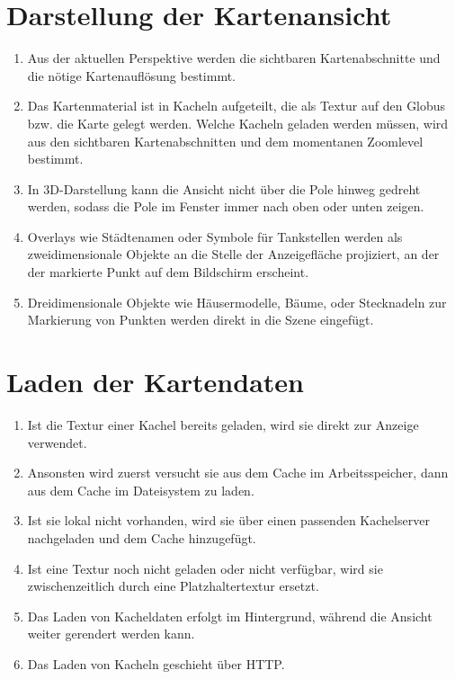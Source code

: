 \documentclass[10pt]{scrreprt}
\begin{document}
\section{Darstellung der Kartenansicht}
\begin{enumerate}[leftmargin=2cm]
\item Aus der aktuellen Perspektive werden die sichtbaren Kartenabschnitte und die nötige Kartenauflösung bestimmt.
\item Das Kartenmaterial ist in Kacheln aufgeteilt, die als Textur auf den Globus bzw. die Karte gelegt werden. Welche Kacheln geladen werden müssen, wird  aus den sichtbaren Kartenabschnitten und dem momentanen Zoomlevel bestimmt.
\item In 3D-Darstellung kann die Ansicht nicht über die Pole hinweg gedreht werden, sodass die Pole im Fenster immer nach oben oder unten zeigen.
\item Overlays wie Städtenamen oder Symbole für Tankstellen werden als zweidimensionale Objekte an die Stelle der Anzeigefläche projiziert, an der der markierte Punkt auf dem Bildschirm erscheint.
\item \W Dreidimensionale Objekte wie Häusermodelle, Bäume, oder Stecknadeln zur Markierung von Punkten werden direkt in die Szene eingefügt.
\end{enumerate}

\section{Laden der Kartendaten}
\begin{enumerate}[resume,leftmargin=2cm]
\item Ist die Textur einer Kachel bereits geladen, wird sie direkt zur Anzeige verwendet.
\item \W Ansonsten wird zuerst versucht sie aus dem Cache im Arbeitsspeicher, dann aus dem Cache im Dateisystem zu laden.
\item Ist sie lokal nicht vorhanden, wird sie über einen passenden Kachelserver nachgeladen und dem Cache hinzugefügt.
\item Ist eine Textur noch nicht geladen oder nicht verfügbar, wird sie zwischenzeitlich durch eine Platzhaltertextur ersetzt.
\item Das Laden von Kacheldaten erfolgt im Hintergrund, während die Ansicht weiter gerendert werden kann.
\item Das Laden von Kacheln geschieht über HTTP.
\end{enumerate}
\end{document}
